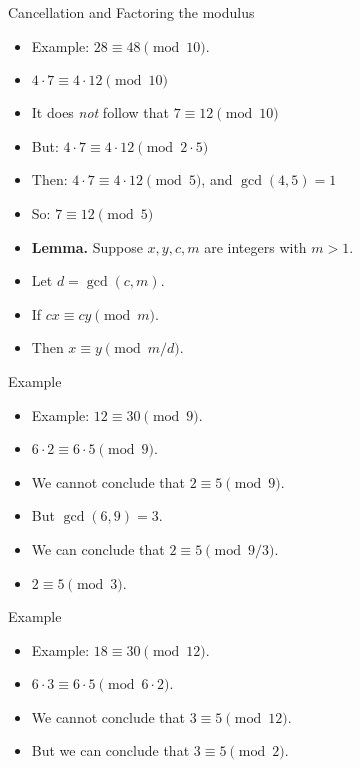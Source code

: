 \documentclass[handout]{beamer}
\begin{document}
\begin{frame}{Cancellation and Factoring the modulus}
\begin{itemize}
  \item Example: $28 \equiv 48 \pmod {10}$.
  \item $4\cdot 7 \equiv 4 \cdot 12 \pmod {10}$
  \item It does \emph{not} follow that $7 \equiv 12 \pmod {10}$
  \item But:  $4\cdot 7 \equiv 4 \cdot 12 \pmod {2\cdot 5}$
  \item Then:  $4\cdot 7 \equiv 4 \cdot 12 \pmod {5}$, and $\gcd(4,5) = 1$
  \item So:  $7 \equiv  12 \pmod {5}$
  \item \textbf{Lemma.} Suppose $x,y,c,m$ are integers with $m>1$.
  \item Let $d=\gcd(c,m)$.
  \item If $cx\equiv cy \pmod m$.
  \item Then $x\equiv y \pmod {m/d}$.
\end{itemize}
\end{frame}

\begin{frame}{Example}
\begin{itemize}
  \item Example: $12 \equiv 30 \pmod {9}$.
  \item $6 \cdot 2 \equiv 6 \cdot 5 \pmod {9}$.
  \item We cannot conclude that $2\equiv 5 \pmod {9}$.
  \item But $\gcd(6,9) = 3$.
  \item We can conclude that $2\equiv 5 \pmod {9/3}$.
  \item $2\equiv 5 \pmod 3$.
\end{itemize}
\end{frame}

\begin{frame}{Example}
\begin{itemize}
  \item Example: $18 \equiv 30 \pmod {12}$.
  \item $6 \cdot 3 \equiv 6 \cdot 5 \pmod {6\cdot 2}$.
  \item We cannot conclude that $3\equiv 5 \pmod {12}$.
  \item But we can conclude that $3\equiv 5 \pmod 2$.
\end{itemize}
\end{frame}
\end{document}
